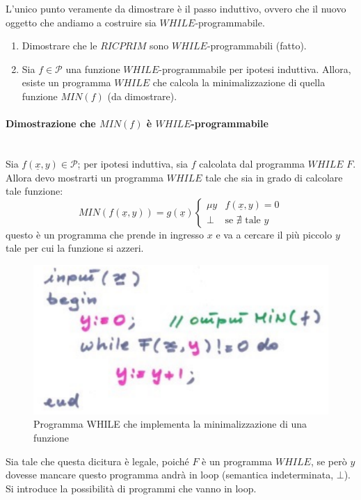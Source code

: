 \documentclass{article}
\begin{document}
L'unico punto veramente da dimostrare è il passo induttivo, ovvero che il nuovo oggetto
che andiamo a costruire sia $WHILE$-programmabile.

\begin{enumerate}
    \item Dimostrare che le $RICPRIM$ sono $WHILE$-programmabili (fatto).
    \item Sia $f\in\mathcal{P}$ una funzione $WHILE$-programmabile per ipotesi induttiva.
          Allora, esiste un programma $WHILE$ che calcola la minimalizzazione di quella funzione
          $MIN(f)$ (da dimostrare).
\end{enumerate}
\paragraph{Dimostrazione che $MIN(f)$ è $WHILE$-programmabile}\mbox{}\\
Sia $f(\underline{x},y)\in\mathcal{P}$; per ipotesi induttiva, sia $f$ calcolata dal
programma $WHILE$ $F$. Allora devo mostrarti un programma $WHILE$ tale che sia in grado
di calcolare tale funzione:
\[
    MIN(f(\underline{x},y))=g(\underline{x})
    \begin{cases}
        \mu y & f(\underline{x},y)=0             \\
        \bot  & \text{se }\nexists\text{ tale }y
    \end{cases}
\]
questo è un programma che prende in ingresso $x$ e va a cercare il più piccolo $y$
tale per cui la funzione si azzeri.
\begin{figure}[H]
    \centering
    \includegraphics[scale=0.5]{images/while-prog-min.png}
    \caption{Programma WHILE che implementa la minimalizzazione di una funzione}
\end{figure}
Sia tale che questa dicitura è legale, poiché $F$ è un programma $WHILE$, se però
$y$ dovesse mancare questo programma andrà in loop (semantica indeterminata, $\bot$). Si introduce
la possibilità di programmi che vanno in loop.
\end{document}
